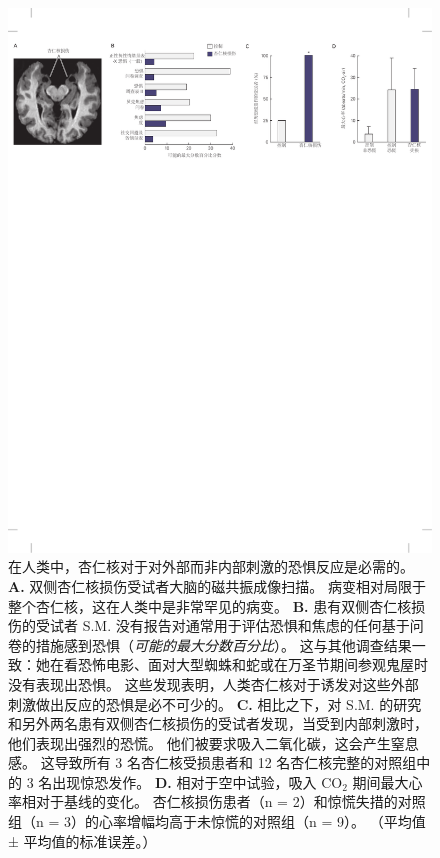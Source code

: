 \begin{figure}[htbp]
	\centering
	\includegraphics[width=1.0\linewidth]{chap42/fig_42_6}
	\caption{在人类中，杏仁核对于对外部而非内部刺激的恐惧反应是必需的。
		\textbf{A.} 双侧杏仁核损伤受试者大脑的磁共振成像扫描。
		病变相对局限于整个杏仁核，这在人类中是非常罕见的病变。
		\textbf{B.} 患有双侧杏仁核损伤的受试者 S.M. 没有报告对通常用于评估恐惧和焦虑的任何基于问卷的措施感到恐惧（\textit{可能的最大分数百分比}）。
		这与其他调查结果一致：她在看恐怖电影、面对大型蜘蛛和蛇或在万圣节期间参观鬼屋时没有表现出恐惧。
		这些发现表明，人类杏仁核对于诱发对这些外部刺激做出反应的恐惧是必不可少的。
		\textbf{C.} 相比之下，对 S.M. 的研究和另外两名患有双侧杏仁核损伤的受试者发现，当受到内部刺激时，他们表现出强烈的恐慌。
		他们被要求吸入二氧化碳，这会产生窒息感。
		这导致所有 3 名杏仁核受损患者和 12 名杏仁核完整的对照组中的 3 名出现惊恐发作。
		\textbf{D.} 相对于空中试验，吸入 CO$_2$ 期间最大心率相对于基线的变化。
		杏仁核损伤患者（n = 2）和惊慌失措的对照组（n = 3）的心率增幅均高于未惊慌的对照组（n = 9）。
		（平均值 ± 平均值的标准误差。）\cite{feinstein2011human} }
	\label{fig:42_6}
\end{figure}


